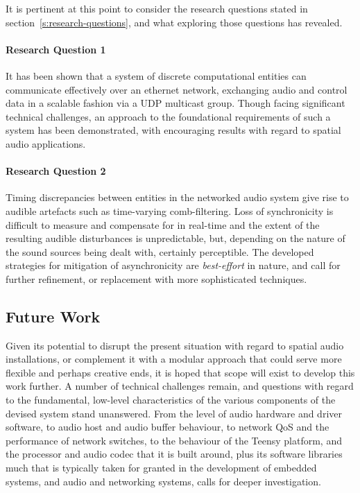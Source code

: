 It is pertinent at this point to consider the research questions stated in
section~\ref{s:research-questions}, and what exploring those questions has
revealed.

\paragraph{Research Question 1}
It has been shown that a system of discrete computational entities can
communicate effectively over an ethernet network, exchanging audio and control
data in a scalable fashion via a UDP multicast group.
Though facing significant technical challenges, an approach to the foundational
requirements of such a system has been demonstrated, with encouraging results
with regard to spatial audio applications.

\paragraph{Research Question 2}
Timing discrepancies between entities in the networked audio system give rise
to audible artefacts such as time-varying comb-filtering.
Loss of synchronicity is difficult to measure and compensate for in real-time
and the extent of the resulting audible disturbances is unpredictable, but,
depending on the nature of the sound sources being dealt with,
certainly perceptible.
The developed strategies for mitigation of asynchronicity are
\textit{best-effort} in nature, and call for further refinement, or replacement
with more sophisticated techniques.

\subsection{Future Work}\label{subsec:future-work}

Given its potential to disrupt the present situation with regard to spatial
audio installations, or complement it with a modular approach that could serve
more flexible and perhaps creative ends, it is hoped that scope will exist to
develop this work further.
A number of technical challenges remain, and questions with regard to the
fundamental, low-level characteristics of the various components of the devised
system stand unanswered.
From the level of audio hardware and driver software, to audio host and audio
buffer behaviour, to network QoS and the performance of network switches, to
the behaviour of the Teensy platform, and the processor and audio codec that it
is built around, plus its software libraries \textemdash{} much that is
typically taken for granted in the development of embedded systems, and audio
and networking systems, calls for deeper investigation.

